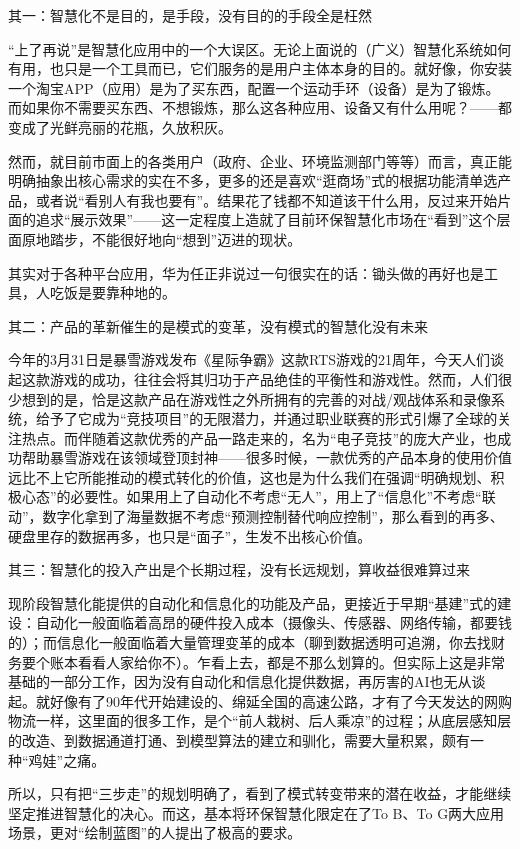 \documentclass[]{book}
\begin{document}
其一：智慧化不是目的，是手段，没有目的的手段全是枉然

``上了再说''是智慧化应用中的一个大误区。无论上面说的（广义）智慧化系统如何有用，也只是一个工具而已，它们服务的是用户主体本身的目的。就好像，你安装一个淘宝APP（应用）是为了买东西，配置一个运动手环（设备）是为了锻炼。而如果你不需要买东西、不想锻炼，那么这各种应用、设备又有什么用呢？------都变成了光鲜亮丽的花瓶，久放积灰。

然而，就目前市面上的各类用户（政府、企业、环境监测部门等等）而言，真正能明确抽象出核心需求的实在不多，更多的还是喜欢``逛商场''式的根据功能清单选产品，或者说``看别人有我也要有''。结果花了钱都不知道该干什么用，反过来开始片面的追求``展示效果''------这一定程度上造就了目前环保智慧化市场在``看到''这个层面原地踏步，不能很好地向``想到''迈进的现状。

其实对于各种平台应用，华为任正非说过一句很实在的话：锄头做的再好也是工具，人吃饭是要靠种地的。

其二：产品的革新催生的是模式的变革，没有模式的智慧化没有未来

今年的3月31日是暴雪游戏发布《星际争霸》这款RTS游戏的21周年，今天人们谈起这款游戏的成功，往往会将其归功于产品绝佳的平衡性和游戏性。然而，人们很少想到的是，恰是这款产品在游戏性之外所拥有的完善的对战/观战体系和录像系统，给予了它成为``竞技项目''的无限潜力，并通过职业联赛的形式引爆了全球的关注热点。而伴随着这款优秀的产品一路走来的，名为``电子竞技''的庞大产业，也成功帮助暴雪游戏在该领域登顶封神------很多时候，一款优秀的产品本身的使用价值远比不上它所能推动的模式转化的价值，这也是为什么我们在强调``明确规划、积极心态''的必要性。如果用上了自动化不考虑``无人''，用上了``信息化''不考虑``联动''，数字化拿到了海量数据不考虑``预测控制替代响应控制''，那么看到的再多、硬盘里存的数据再多，也只是``面子''，生发不出核心价值。

其三：智慧化的投入产出是个长期过程，没有长远规划，算收益很难算过来

现阶段智慧化能提供的自动化和信息化的功能及产品，更接近于早期``基建''式的建设：自动化一般面临着高昂的硬件投入成本（摄像头、传感器、网络传输，都要钱的）；而信息化一般面临着大量管理变革的成本（聊到数据透明可追溯，你去找财务要个账本看看人家给你不）。乍看上去，都是不那么划算的。但实际上这是非常基础的一部分工作，因为没有自动化和信息化提供数据，再厉害的AI也无从谈起。就好像有了90年代开始建设的、绵延全国的高速公路，才有了今天发达的网购物流一样，这里面的很多工作，是个``前人栽树、后人乘凉''的过程；从底层感知层的改造、到数据通道打通、到模型算法的建立和驯化，需要大量积累，颇有一种``鸡娃''之痛。

所以，只有把``三步走''的规划明确了，看到了模式转变带来的潜在收益，才能继续坚定推进智慧化的决心。而这，基本将环保智慧化限定在了To B、To G两大应用场景，更对``绘制蓝图''的人提出了极高的要求。
\end{document}
